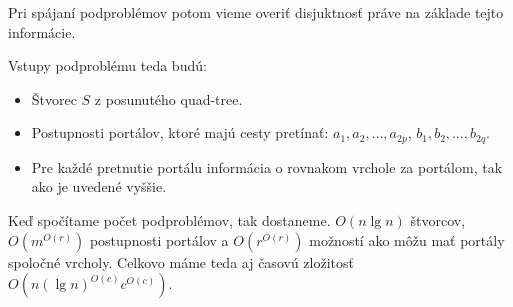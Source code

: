 Pri spájaní podproblémov potom vieme overiť disjuktnosť práve na základe tejto informácie.

Vstupy podproblému teda budú:
\begin{itemize}
\item Štvorec $S$ z posunutého quad-tree.
\item Postupnosti portálov, ktoré majú cesty pretínať: $a_1, a_2, \dots, a_{2p}$, $b_1, b_2, \dots, b_{2q}$.
\item Pre každé pretnutie portálu informácia o rovnakom vrchole za portálom, tak ako je uvedené
vyššie.
\end{itemize}

Keď spočítame počet podproblémov, tak dostaneme. $O(n \lg n)$ štvorcov, $O(m^{O(r)})$
postupnosti portálov a $O(r^{O(r)})$ možností ako môžu mať portály spoločné vrcholy.
Celkovo máme teda aj časovú zložitosť $O(n (\lg n)^{O(c)} c^{O(c)})$. 
